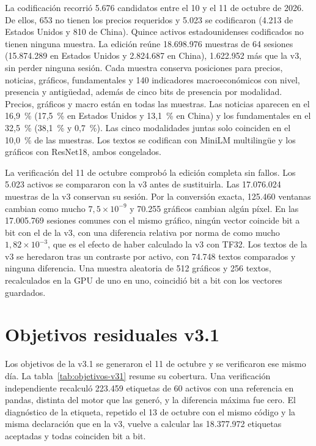 \documentclass[11pt,a4paper]{report}
\begin{document}
La codificación recorrió 5.676 candidatos entre el 10 y el 11 de octubre de
2026. De ellos, 653 no tienen los precios requeridos y 5.023 se codificaron
(4.213 de Estados Unidos y 810 de China). Quince activos estadounidenses
codificados no tienen ninguna muestra. La edición reúne 18.698.976 muestras de
64 sesiones (15.874.289 en Estados Unidos y 2.824.687 en China), 1.622.952 más
que la v3, sin perder ninguna sesión. Cada muestra conserva posiciones para
precios, noticias, gráficos, fundamentales y 140 indicadores macroeconómicos
con nivel, presencia y antigüedad, además de cinco bits de presencia por
modalidad. Precios, gráficos y macro están en todas las muestras. Las noticias
aparecen en el 16,9~\% (17,5~\% en Estados Unidos y 13,1~\% en China) y los
fundamentales en el 32,5~\% (38,1~\% y 0,7~\%). Las cinco modalidades juntas
solo coinciden en el 10,0~\% de las muestras. Los textos se codifican con
MiniLM multilingüe y los gráficos con ResNet18, ambos congelados.

La verificación del 11 de octubre comprobó la edición completa sin fallos. Los
5.023 activos se compararon con la v3 antes de sustituirla. Las 17.076.024
muestras de la v3 conservan su sesión. Por la conversión exacta, 125.460
ventanas cambian como mucho $7{,}5 \times 10^{-9}$ y 70.255 gráficos cambian
algún píxel. En las 17.005.769 sesiones comunes con el mismo gráfico, ningún
vector coincide bit a bit con el de la v3, con una diferencia relativa por
norma de como mucho $1{,}82 \times 10^{-3}$, que es el efecto de haber
calculado la v3 con TF32. Los textos de la v3 se heredaron tras un contraste por activo, con
74.748 textos comparados y ninguna diferencia. Una muestra aleatoria de 512
gráficos y 256 textos, recalculados en la GPU de uno en uno, coincidió bit a
bit con los vectores guardados.

\section{Objetivos residuales v3.1}
Los objetivos de la v3.1 se generaron el 11 de octubre y se verificaron ese
mismo día. La tabla~\ref{tab:objetivos-v31} resume su cobertura. Una
verificación independiente recalculó 223.459 etiquetas de 60 activos con una
referencia en pandas, distinta del motor que las generó, y la diferencia
máxima fue cero. El diagnóstico de la etiqueta, repetido el 13 de octubre con
el mismo código y la misma declaración que en la v3, vuelve a calcular las
18.377.972 etiquetas aceptadas y todas coinciden bit a bit.
\end{document}
